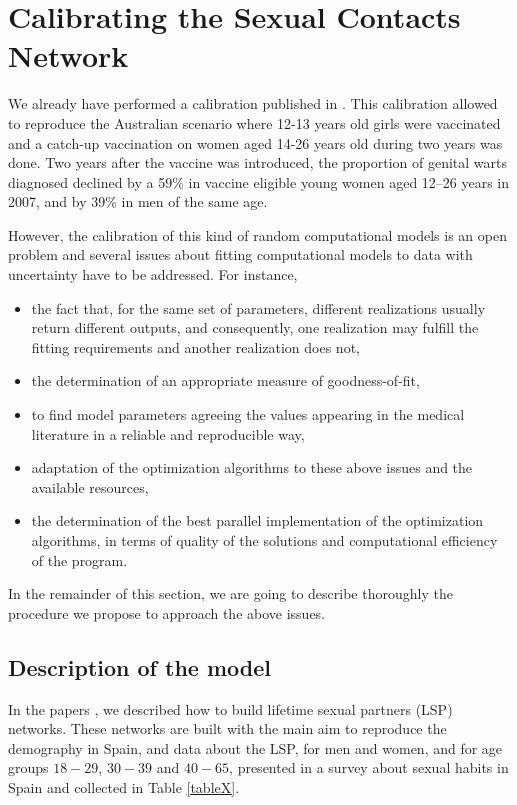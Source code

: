 \chapter{Calibrating the Sexual Contacts Network }\label{Calibrado}

We already have performed a calibration published in \cite{Acedo2017}. This calibration allowed to reproduce the Australian scenario \cite{DezDomingo2017} where 12-13 years old girls were vaccinated and a catch-up vaccination on women aged 14-26 years old during two years was done. Two years after the vaccine was introduced, the proportion of genital warts diagnosed declined by a 59\% in vaccine eligible young women aged 12–26 years in 2007, and by 39\% in men of the same age.

However, the calibration of this kind of random computational models is an open problem and several issues about fitting computational models to data with uncertainty have to be addressed. For instance, 

\begin{itemize}
	\item the fact that, for the same set of parameters, different realizations usually return different outputs, and consequently, one realization may fulfill the fitting requirements and another realization does not,
	\item the determination of an appropriate measure of goodness-of-fit,
	\item to find model parameters agreeing the values appearing in the medical literature in a reliable and reproducible way,
	\item adaptation of the optimization algorithms to these above issues and the available resources,
	\item the determination of the best parallel implementation of the optimization algorithms, in terms of quality of the solutions and computational efficiency of the program.
\end{itemize} 

In the remainder of this section, we are going to describe thoroughly the procedure we propose to approach the above issues.

\section{Description of the model}\label{sec:modelo}
In the papers \cite{Acedo2017,DezDomingo2017}, we described how to build lifetime sexual partners (LSP) networks. These networks are built with the main aim to reproduce the demography in Spain, \cite{pegv} and data about the LSP, for men and women, and for age groups $18-29$, $30-39$ and $40-65$, presented in a survey about sexual habits in Spain \cite{INE} and collected in Table \ref{tableX}. 

